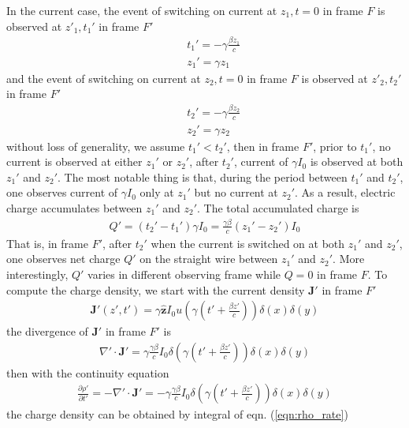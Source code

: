 \documentclass[prd,showpacs,twocolumn]{revtex4-1}
\begin{document}
In the current case, the event of switching on current at $z_1, t=0$ in frame $F$ is observed at $z'_1,t_1'$ in frame $F'$
\begin{eqnarray}
&&t_1'=-\gamma\frac{\beta z_1}{c}\nonumber\\
&&z_1'=\gamma z_1
\label{eqn:LorentzTranformation1}
\end{eqnarray}
and the event of switching on current at $z_2, t=0$ in frame $F$ is observed at $z'_2,t_2'$ in frame $F'$
\begin{eqnarray}
&&t_2'=-\gamma\frac{\beta z_2}{c}\nonumber\\
&&z_2'=\gamma z_2
\label{eqn:LorentzTranformation2}
\end{eqnarray}
without loss of generality, we assume $t_1'<t_2'$, then in frame $F'$, prior to $t_1'$, no current is observed at either $z_1'$ or $z_2'$, after $t_2'$, current of $\gamma I_0$ is observed at both $z_1'$ and $z_2'$. The most notable thing is that, during the period between $t_1'$ and $t_2'$, one observes current of $\gamma I_0$ only at $z_1'$ but no current at $z_2'$. As a result, electric charge accumulates between $z_1'$ and $z_2'$. The total accumulated charge is
\begin{eqnarray}
Q'=(t_2'-t_1')\gamma I_0=\frac{\gamma\beta}{c}(z_1'-z_2')I_0
\label{eqn:totalCharge}
\end{eqnarray}
That is, in frame $F'$, after $t_2'$ when the current is switched on at both $z_1'$ and $z_2'$, one observes net charge $Q'$ on the straight wire between $z_1'$ and $z_2'$. More interestingly, $Q'$ varies in different observing frame while $Q=0$ in frame $F$. To compute the charge density, we start with the current density $\mathbf{J'}$ in frame $F'$
\begin{eqnarray}
\mathbf{J'}(z',t')=\gamma\mathbf{\hat{z}} I_0u(\gamma(t'+\frac{\beta z'}{c}))\delta(x)\delta(y)
\label{eqn:JP}
\end{eqnarray}
the divergence of $\mathbf{J'}$ in frame $F'$ is
\begin{eqnarray}
\nabla'\cdot\mathbf{J'}=\gamma\frac{\gamma\beta}{c} I_0\delta(\gamma(t'+\frac{\beta z'}{c}))\delta(x)\delta(y)
\label{eqn:DivJP}
\end{eqnarray}
then with the continuity equation
\begin{eqnarray}
\frac{\partial\rho'}{\partial t'}=-\nabla'\cdot\mathbf{J'}=-\gamma\frac{\gamma\beta}{c} I_0\delta(\gamma(t'+\frac{\beta z'}{c}))\delta(x)\delta(y)
\label{eqn:rho_rate}
\end{eqnarray}
the charge density can be obtained by integral of eqn. (\ref{eqn:rho_rate})
\end{document}
